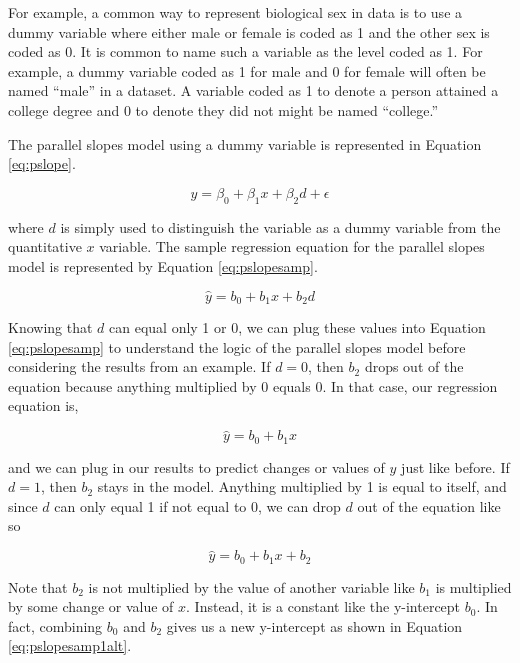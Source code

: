 \documentclass[
]{book}
\begin{document}
For example, a common way to represent biological sex in data is to use a dummy variable where either male or female is coded as 1 and the other sex is coded as 0. It is common to name such a variable as the level coded as 1. For example, a dummy variable coded as 1 for male and 0 for female will often be named ``male'' in a dataset. A variable coded as 1 to denote a person attained a college degree and 0 to denote they did not might be named ``college.''

The parallel slopes model using a dummy variable is represented in Equation \eqref{eq:pslope}.

\begin{equation}
y = \beta_0 + \beta_1x + \beta_2d + \epsilon
\label{eq:pslope}
\end{equation}

where \(d\) is simply used to distinguish the variable as a dummy variable from the quantitative \(x\) variable. The sample regression equation for the parallel slopes model is represented by Equation \eqref{eq:pslopesamp}.

\begin{equation}
\hat{y} = b_0 + b_1x + b_2d
\label{eq:pslopesamp}
\end{equation}

Knowing that \(d\) can equal only 1 or 0, we can plug these values into Equation \eqref{eq:pslopesamp} to understand the logic of the parallel slopes model before considering the results from an example. If \(d=0\), then \(b_2\) drops out of the equation because anything multiplied by 0 equals 0. In that case, our regression equation is,

\begin{equation}
\hat{y} = b_0 + b_1x
\label{eq:pslopesamp0}
\end{equation}

and we can plug in our results to predict changes or values of \(y\) just like before. If \(d=1\), then \(b_2\) stays in the model. Anything multiplied by 1 is equal to itself, and since \(d\) can only equal 1 if not equal to 0, we can drop \(d\) out of the equation like so

\begin{equation}
\hat{y} = b_0 + b_1x + b_2
\label{eq:pslopesamp1}
\end{equation}

Note that \(b_2\) is not multiplied by the value of another variable like \(b_1\) is multiplied by some change or value of \(x\). Instead, it is a constant like the y-intercept \(b_0\). In fact, combining \(b_0\) and \(b_2\) gives us a new y-intercept as shown in Equation \eqref{eq:pslopesamp1alt}.
\end{document}
